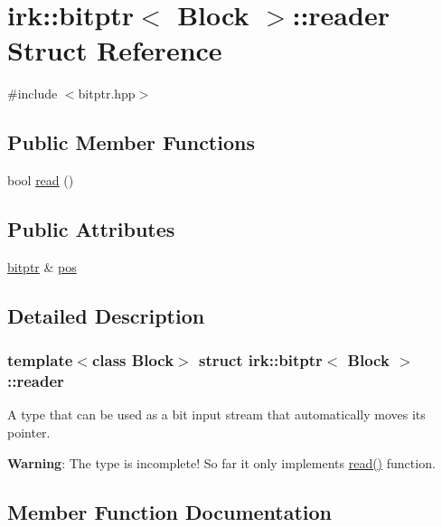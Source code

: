 \hypertarget{structirk_1_1bitptr_1_1reader}{}\section{irk\+:\+:bitptr$<$ Block $>$\+:\+:reader Struct Reference}
\label{structirk_1_1bitptr_1_1reader}


{\ttfamily \#include $<$bitptr.\+hpp$>$}

\subsection*{Public Member Functions}
\begin{DoxyCompactItemize}
\item 
bool \mbox{\hyperlink{structirk_1_1bitptr_1_1reader_ae3eaee83cecc7193fc16a1f31cdddb92}{read}} ()
\end{DoxyCompactItemize}
\subsection*{Public Attributes}
\begin{DoxyCompactItemize}
\item 
\mbox{\hyperlink{classirk_1_1bitptr}{bitptr}} \& \mbox{\hyperlink{structirk_1_1bitptr_1_1reader_af27825b949fe047a40e95730fd7631d3}{pos}}
\end{DoxyCompactItemize}


\subsection{Detailed Description}
\subsubsection*{template$<$class Block$>$\newline
struct irk\+::bitptr$<$ Block $>$\+::reader}

A type that can be used as a bit input stream that automatically moves its pointer. ~\newline


{\bfseries Warning}\+: The type is incomplete! So far it only implements {\ttfamily \mbox{\hyperlink{structirk_1_1bitptr_1_1reader_ae3eaee83cecc7193fc16a1f31cdddb92}{read()}}} function. 

\subsection{Member Function Documentation}
\mbox{\label{structirk_1_1bitptr_1_1reader_ae3eaee83cecc7193fc16a1f31cdddb92}} 
